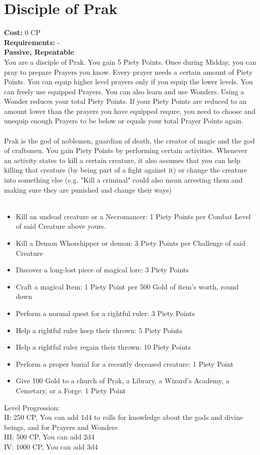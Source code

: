 \section{Disciple of Prak}
\textbf{Cost:} 0 CP\\
\textbf{Requirements:} - \\
\textbf{Passive, Repeatable}\\
You are a disciple of Prak. You gain 5 Piety Points. Once during Midday, you can pray to prepare Prayers you know. Every prayer needs a certain amount of Piety Points. You can equip higher level prayers only if you equip the lower levels. You can freely use equipped Prayers. You can also learn and use Wonders. Using a Wonder reduces your total Piety Points. If your Piety Points are reduced to an amount lower than the prayers you have equipped requre, you need to choose and unequip enough Prayers to be below or equals your total Prayer Points again.\\
\\
Prak is the god of noblemen, guardian of death, the creator of magic and the god of craftsmen. You gain Piety Points by performing certain activities. Whenever an activity states to kill a certain creature, it also assumes that you can help killing that creature (by being part of a fight against it) or change the creature into something else (e.g. "Kill a criminal" could also mean arresting them and making sure they are punished and change their ways)\\
\\
\begin{itemize}
	\item Kill an undead creature or a Necromancer: 1 Piety Points  per Combat Level of said Creature above yours.
	\item Kill a Demon Whorshipper or demon: 3 Piety Points per Challenge of said Creature
	\item Discover a long-lost piece of magical lore: 3 Piety Points
	\item Craft a magical Item: 1 Piety Point per 500 Gold of item's worth, round down
	\item Perform a normal quest for a rightful ruler: 3 Piety Points
	\item Help a rightful ruler keep their thrown: 5 Piety Points
	\item Help a rightful ruler regain their thrown: 10 Piety Points
	\item Perform a proper burial for a recently deceased creature: 1 Piety Point
	\item Give 100 Gold to a church of Prak, a Library, a Wizard's Academy, a Cemetary, or a Forge: 1 Piety Point
\end{itemize}

Level Progression:\\
II: 250 CP, You can add 1d4 to rolls for knowledge about the gods and divine beings, and for Prayers and Wonders\\
III: 500 CP, You can add 2d4\\
IV: 1000 CP, You can add 3d4\\